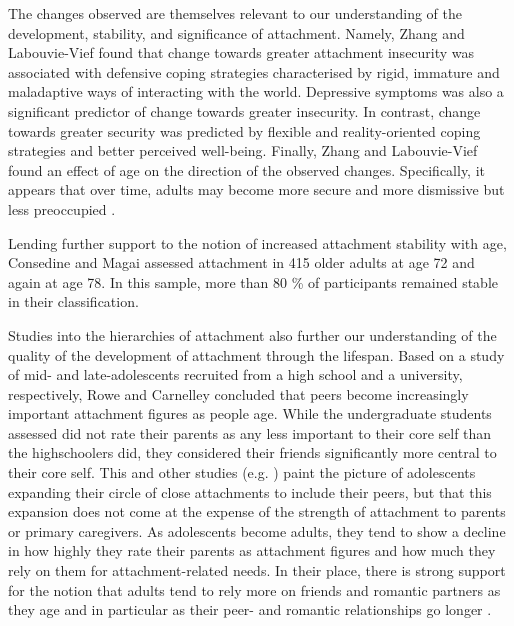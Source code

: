 \documentclass[12pt]{report}
\begin{document}
The changes observed are themselves relevant to our understanding of the development, stability, and significance of attachment. Namely, Zhang and Labouvie-Vief found that change towards greater attachment insecurity was associated with defensive coping strategies characterised by rigid, immature and maladaptive ways of interacting with the world. Depressive symptoms was also a significant predictor of change towards greater insecurity. In contrast, change towards greater security was predicted by flexible and reality-oriented coping strategies and better perceived well-being.
Finally, Zhang and Labouvie-Vief found an effect of age on the direction of the observed changes. Specifically, it appears that over time, adults may become more secure and more dismissive but less preoccupied  \cite{Zhang2004}.

Lending further support to the notion of increased attachment stability with age, Consedine and Magai assessed attachment in 415 older adults at age 72 and again at age 78. In this sample, more than 80 \% of participants remained stable in their classification.

Studies into the hierarchies of attachment also further our understanding of the quality of the development of attachment through the lifespan.
Based on a study of mid- and late-adolescents recruited from a high school and a university, respectively, Rowe and Carnelley \cite{Rowe2005} concluded that peers become increasingly important attachment figures as people age. While the undergraduate students assessed did not rate their parents as any less important to their core self than the highschoolers did, they considered their friends significantly more central to their core self.
This and other studies (e.g. \cite{Fraley1997,Doherty2004}) paint the picture of adolescents expanding their circle of close attachments to include their peers, but that this expansion does not come at the expense of the strength of attachment to parents or primary caregivers.
As adolescents become adults, they tend to show a decline in how highly they rate their parents as attachment figures and how much they rely on them for attachment-related needs. In their place, there is strong support for the notion that adults tend to rely more on friends and romantic partners as they age and in particular as their peer- and romantic relationships go longer \cite{Tancredy2006,Doherty2004,Fraley1997}.
\end{document}
